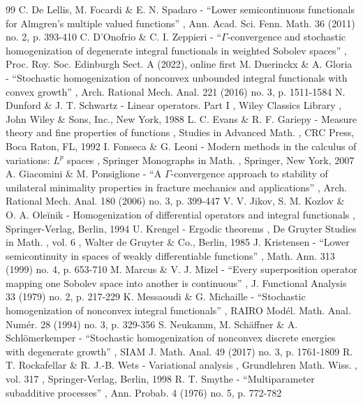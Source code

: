\documentclass[11pt]{article}
\numberwithin{equation}{section}
\theoremstyle{definition}
\begin{document}
\begin{thebibliography}{99}
 C. De Lellis, M. Focardi \& E. N. Spadaro - “Lower semicontinuous functionals for Almgren’s multiple valued functions” , Ann. Acad. Sci. Fenn. Math. 36 (2011) no. 2, p. 393-410
 C. D’Onofrio \& C. I. Zeppieri - “$\Gamma $-convergence and stochastic homogenization of degenerate integral functionals in weighted Sobolev spaces” , Proc. Roy. Soc. Edinburgh Sect. A (2022), online first
 M. Duerinckx \& A. Gloria - “Stochastic homogenization of nonconvex unbounded integral functionals with convex growth” , Arch. Rational Mech. Anal. 221 (2016) no. 3, p. 1511-1584
 N. Dunford \& J. T. Schwartz - Linear operators. Part I , Wiley Classics Library , John Wiley \& Sons, Inc., New York, 1988
 L. C. Evans \& R. F. Gariepy - Measure theory and fine properties of functions , Studies in Advanced Math. , CRC Press, Boca Raton, FL, 1992
 I. Fonseca \& G. Leoni - Modern methods in the calculus of variations: $L^p$ spaces , Springer Monographs in Math. , Springer, New York, 2007
 A. Giacomini \& M. Ponsiglione - “A $\Gamma $-convergence approach to stability of unilateral minimality properties in fracture mechanics and applications” , Arch. Rational Mech. Anal. 180 (2006) no. 3, p. 399-447
 V. V. Jikov, S. M. Kozlov \& O. A. Oleĭnik - Homogenization of differential operators and integral functionals , Springer-Verlag, Berlin, 1994
 U. Krengel - Ergodic theorems , De Gruyter Studies in Math. , vol. 6 , Walter de Gruyter \& Co., Berlin, 1985
 J. Kristensen - “Lower semicontinuity in spaces of weakly differentiable functions” , Math. Ann. 313 (1999) no. 4, p. 653-710
 M. Marcus \& V. J. Mizel - “Every superposition operator mapping one Sobolev space into another is continuous” , J. Functional Analysis 33 (1979) no. 2, p. 217-229
 K. Messaoudi \& G. Michaille - “Stochastic homogenization of nonconvex integral functionals” , RAIRO Modél. Math. Anal. Numér. 28 (1994) no. 3, p. 329-356
 S. Neukamm, M. Schäffner \& A. Schlömerkemper - “Stochastic homogenization of nonconvex discrete energies with degenerate growth” , SIAM J. Math. Anal. 49 (2017) no. 3, p. 1761-1809
 R. T. Rockafellar \& R. J.-B. Wets - Variational analysis , Grundlehren Math. Wiss. , vol. 317 , Springer-Verlag, Berlin, 1998
 R. T. Smythe - “Multiparameter subadditive processes” , Ann. Probab. 4 (1976) no. 5, p. 772-782
\end{thebibliography}
\end{document}
